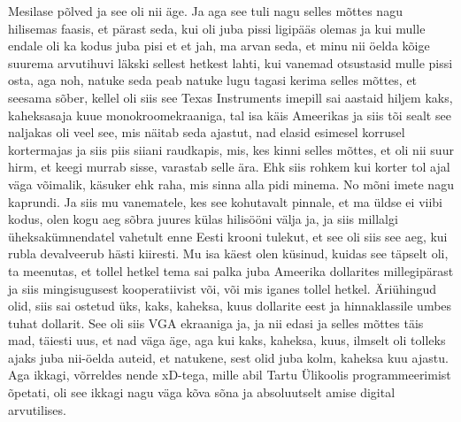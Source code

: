 Mesilase põlved ja see oli nii äge.
Ja aga see tuli nagu selles mõttes nagu hilisemas faasis, et pärast seda, kui oli juba pissi ligipääs olemas ja kui mulle endale oli ka kodus juba pisi et et jah, ma arvan seda, et minu nii öelda kõige suurema arvutihuvi läkski sellest hetkest lahti, kui vanemad otsustasid mulle pissi osta, aga noh, natuke seda peab natuke lugu tagasi kerima selles mõttes, et seesama sõber, kellel oli siis see Texas Instruments imepill sai aastaid hiljem kaks, kaheksasaja kuue monokroomekraaniga, tal isa käis Ameerikas ja siis tõi sealt see naljakas oli veel see, mis näitab seda ajastut, nad elasid esimesel korrusel kortermajas ja siis piis siiani raudkapis, mis, kes kinni selles mõttes, et oli nii suur hirm, et keegi murrab sisse, varastab selle ära.
Ehk siis rohkem kui korter tol ajal väga võimalik, käsuker ehk raha, mis sinna alla pidi minema. No mõni imete nagu kaprundi.
Ja siis mu vanematele, kes see kohutavalt pinnale, et ma üldse ei viibi kodus, olen kogu aeg sõbra juures külas hilisööni välja ja, ja siis millalgi üheksakümnendatel vahetult enne Eesti krooni tulekut, et see oli siis see aeg, kui rubla devalveerub hästi kiiresti. Mu isa käest olen küsinud, kuidas see täpselt oli, ta meenutas, et tollel hetkel tema sai palka juba Ameerika dollarites millegipärast ja siis mingisugusest kooperatiivist või, või mis iganes tollel hetkel. Äriühingud olid, siis sai ostetud üks, kaks, kaheksa, kuus dollarite eest ja hinnaklassile umbes tuhat dollarit. See oli siis VGA ekraaniga ja, ja nii edasi ja selles mõttes täis mad, täiesti uus, et nad väga äge, aga kui kaks, kaheksa, kuus, ilmselt oli tolleks ajaks juba nii-öelda auteid, et natukene, sest olid juba kolm, kaheksa kuu ajastu.
Aga ikkagi, võrreldes nende xD-tega, mille abil Tartu Ülikoolis programmeerimist õpetati, oli see ikkagi nagu väga kõva sõna ja absoluutselt amise digital arvutilises.
